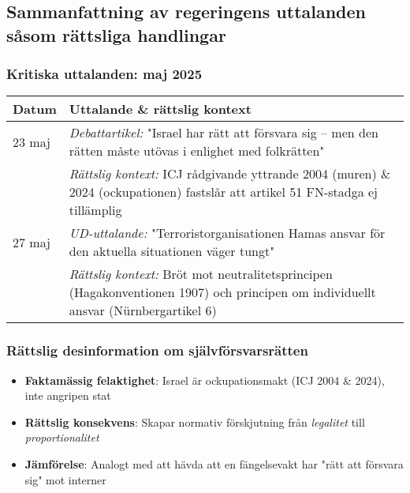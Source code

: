 
\subsection{Sammanfattning av regeringens uttalanden såsom rättsliga handlingar}
\label{subsec:regeringens_positioner}

\subsubsection{Kritiska uttalanden: maj 2025}
\begin{tabular}{p{}p{}}
\textbf{Datum} & \textbf{Uttalande \& rättslig kontext} \\
\hline
23 maj & \textit{Debattartikel:} "Israel har rätt att försvara sig – men den rätten måste utövas i enlighet med folkrätten" \\
& \footnotesize\textit{Rättslig kontext:} ICJ rådgivande yttrande 2004 (muren) \& 2024 (ockupationen) fastslår att artikel 51 FN-stadga ej tillämplig \\
\hline
27 maj & \textit{UD-uttalande:} "Terroristorganisationen Hamas ansvar för den aktuella situationen väger tungt" \\
& \footnotesize\textit{Rättslig kontext:} Bröt mot neutralitetsprincipen (Hagakonventionen 1907) och principen om individuellt ansvar (Nürnbergartikel 6) \\
\end{tabular}

\subsubsection{Rättslig desinformation om självförsvarsrätten}
\begin{itemize}
\item \textbf{Faktamässig felaktighet}: Israel är ockupationsmakt (ICJ 2004 \& 2024), inte angripen stat
\item \textbf{Rättslig konsekvens}: Skapar normativ förskjutning från \textit{legalitet} till \textit{proportionalitet}
\item \textbf{Jämförelse}: Analogt med att hävda att en fängelsevakt har "rätt att försvara sig" mot interner
\end{itemize}

